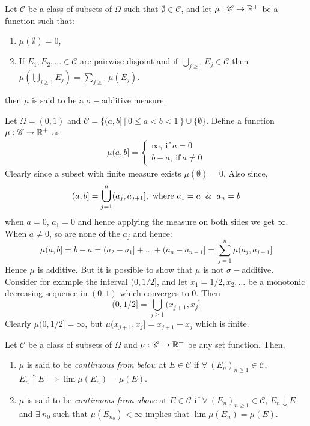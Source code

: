 \begin{definition}
  Let $ \mathscr{C}$ be a class of subsets of $\Omega$ such that $\emptyset \in \mathscr{C}$, and let $\mu: \mathscr{C}\to\mathbb{R}^+$ be a function such that:
  \begin{enumerate}
    \item $\mu(\emptyset) = 0$,
    \item If $E_1,E_2,... \in \mathscr{C}$ are pairwise disjoint and if $\bigcup_{j\geq1}E_j \in \mathscr{C}$ then $\mu(\bigcup_{j\geq1}E_j)=\sum_{j\geq1}\mu(E_j)$.
  \end{enumerate}
  then $\mu$ is said to be a $\sigma-$additive measure.
\end{definition}
\begin{example}
  Let $\Omega = (0,1)$ and $ \mathscr{C} = \{(a,b]\ |\ 0\leq a < b < 1\ \}\cup\{\emptyset\}$. Define a function $\mu: \mathscr{C}\to \mathbb{R}^+$ as:
  \begin{align*}
    \mu(a,b] = \begin{cases}
      \infty,\ \text{if}\ a=0\\
      b-a,\ \text{if}\ a\neq 0
    \end{cases}
  \end{align*}
  Clearly since a subset with finite measure exists $\mu(\emptyset) = 0$. Also since,
  \[(a,b] = \bigcup_{j=1}^n (a_j,a_{j+1}],\ \text{where}\ a_1 = a \And a_n=b\] 
  when $a=0$, $a_1 = 0$ and hence applying the measure on both sides we get $\infty$. When $a\neq 0$, so are none of the $a_j$ and hence:
  \[\mu(a,b] = b-a = (a_2 - a_1] + ... + (a_n - a_{n-1}] = \sum_{j=1}^n\mu(a_j,a_{j+1}]\]
  Hence $\mu$ is additive. But it is possible to show that $\mu$ is not $\sigma-$additive. Consider for example the interval $(0,1/2]$, and let $x_1=1/2,x_2,...$ be a monotonic decreasing sequence in $(0,1)$ which converges to $0$. Then
  \[(0,1/2] = \bigcup_{j\geq 1} (x_{j+1}, x_j]\]
  Clearly $\mu(0,1/2] = \infty$, but $\mu(x_{j+1},x_j] = x_{j+1} - x_j$ which is finite.
\end{example}
\begin{definition}
  Let $ \mathscr{C}$ be a class of subsets of $\Omega$ and $\mu: \mathscr{C}\to \mathbb{R}^+$ be any set function. Then,
  \begin{enumerate}
    \item $\mu$ is said to be \textit{continuous from below} at $E\in \mathscr{C}$ if $\forall\ (E_n)_{n\geq 1}\in \mathscr{C}$, $E_n \uparrow E \implies \lim\mu(E_n) = \mu(E)$.
    \item $\mu$ is said to be \textit{continuous from above} at $E\in \mathscr{C}$ if $\forall\ (E_n)_{n\geq 1}\in \mathscr{C}$, $E_n \downarrow E$ and $\exists\ n_0$ such that $\mu(E_{n_0}) <\infty$ implies that $\lim\mu(E_n)= \mu(E)$. 
  \end{enumerate}
\end{definition}
